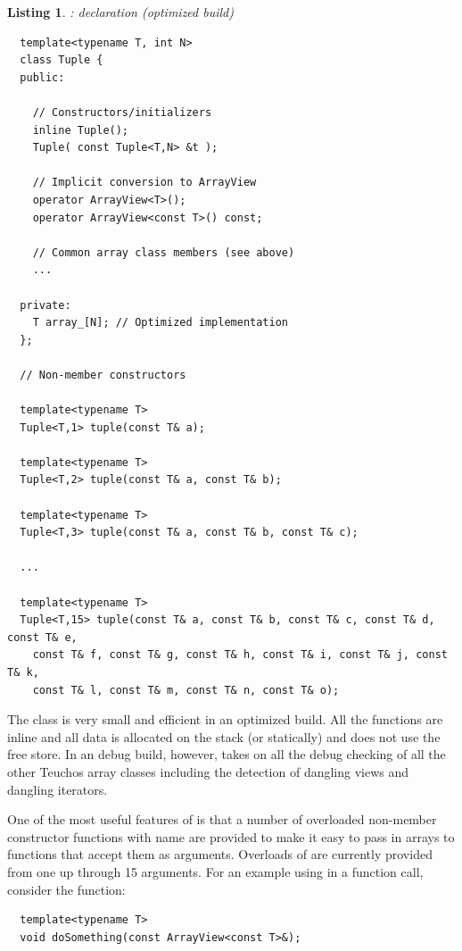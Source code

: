 \documentclass[pdf,ps2pdf,11pt]{SANDreport}
\newtheorem{listing}{Listing}
\begin{document}
\begin{listing}: {} declaration (optimized build) \\
\label{listing:Tuple}
{\small\begin{verbatim}
  template<typename T, int N>
  class Tuple {
  public:
    
    // Constructors/initializers
    inline Tuple();
    Tuple( const Tuple<T,N> &t );
  
    // Implicit conversion to ArrayView
    operator ArrayView<T>();
    operator ArrayView<const T>() const;
    
    // Common array class members (see above)
    ...
  
  private:
    T array_[N]; // Optimized implementation
  };
  
  // Non-member constructors
  
  template<typename T>
  Tuple<T,1> tuple(const T& a);
  
  template<typename T>
  Tuple<T,2> tuple(const T& a, const T& b);
  
  template<typename T>
  Tuple<T,3> tuple(const T& a, const T& b, const T& c);
  
  ...
  
  template<typename T>
  Tuple<T,15> tuple(const T& a, const T& b, const T& c, const T& d, const T& e,
    const T& f, const T& g, const T& h, const T& i, const T& j, const T& k,
    const T& l, const T& m, const T& n, const T& o);
\end{verbatim}}
\end{listing}

The class {} is very small and efficient in an optimized
build.  All the functions are inline and all data is allocated on the
stack (or statically) and does not use the free store.  In an debug
build, however, {} takes on all the debug checking of
all the other Teuchos array classes including the detection of
dangling {} views and dangling iterators.

One of the most useful features of {} is that a number
of overloaded non-member constructor functions with name
{} are provided to make it easy to pass in arrays
to functions that accept them as {} arguments.
Overloads of {} are currently provided from one up
through 15 arguments.  For an example using {} in a
function call, consider the function:

{\small\begin{verbatim}
  template<typename T>
  void doSomething(const ArrayView<const T>&);
\end{verbatim}}
\end{document}
